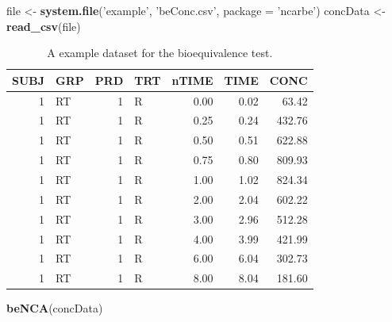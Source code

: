 \documentclass[12pt,]{krantz}
\newenvironment{Shaded}{\begin{snugshade}}{\end{snugshade}}
\newcommand{\KeywordTok}[1]{\textcolor[rgb]{0.13,0.29,0.53}{\textbf{#1}}}
\newcommand{\DataTypeTok}[1]{\textcolor[rgb]{0.13,0.29,0.53}{#1}}
\newcommand{\StringTok}[1]{\textcolor[rgb]{0.31,0.60,0.02}{#1}}
\newcommand{\NormalTok}[1]{#1}
\theoremstyle{definition}
\theoremstyle{definition}
\theoremstyle{definition}
\theoremstyle{remark}
\begin{document}
\begin{Shaded}
\begin{Highlighting}[]
\NormalTok{file <-}\StringTok{ }\KeywordTok{system.file}\NormalTok{(}\StringTok{'example'}\NormalTok{, }\StringTok{'beConc.csv'}\NormalTok{, }\DataTypeTok{package =} \StringTok{'ncarbe'}\NormalTok{)}
\NormalTok{concData <-}\StringTok{ }\KeywordTok{read_csv}\NormalTok{(file)}
\end{Highlighting}
\end{Shaded}

\begin{table}

\caption{\label{tab:beconcdata}A example dataset for the bioequivalence test.}
\centering
\begin{tabular}[t]{r|l|r|l|r|r|r}
\hline
SUBJ & GRP & PRD & TRT & nTIME & TIME & CONC\\
\hline
1 & RT & 1 & R & 0.00 & 0.02 & 63.42\\
\hline
1 & RT & 1 & R & 0.25 & 0.24 & 432.76\\
\hline
1 & RT & 1 & R & 0.50 & 0.51 & 622.88\\
\hline
1 & RT & 1 & R & 0.75 & 0.80 & 809.93\\
\hline
1 & RT & 1 & R & 1.00 & 1.02 & 824.34\\
\hline
1 & RT & 1 & R & 2.00 & 2.04 & 602.22\\
\hline
1 & RT & 1 & R & 3.00 & 2.96 & 512.28\\
\hline
1 & RT & 1 & R & 4.00 & 3.99 & 421.99\\
\hline
1 & RT & 1 & R & 6.00 & 6.04 & 302.73\\
\hline
1 & RT & 1 & R & 8.00 & 8.04 & 181.60\\
\hline
\end{tabular}
\end{table}

\begin{Shaded}
\begin{Highlighting}[]
\KeywordTok{beNCA}\NormalTok{(concData)}
\end{Highlighting}
\end{Shaded}
\end{document}
